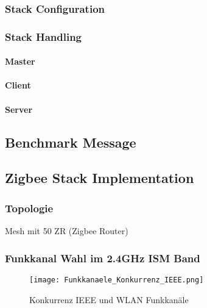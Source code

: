 \subsubsection{Stack Configuration}\label{subsubsec:ZigbeeStackConfiguration}


\subsubsection{Stack Handling}\label{subsubsec:ZigbeeStackHandling}


\paragraph{Master}\label{par:ZigbeeMaster}

\paragraph{Client}\label{par:ZigbeeClient}

\paragraph{Server}\label{par:ZigbeeServer}


\subsection{Benchmark Message}\label{subsec:BenchmarkMessage}

\subsection{Zigbee Stack Implementation}\label{subsec:ZigbeeStackImplementation}

\subsubsection{Topologie}\label{subsubsec:ZigbeeTopologie}

Mesh mit 50 ZR (Zigbee Router)


\subsubsection{Funkkanal Wahl im 2.4GHz ISM Band}\label{subsubsec:FunkkanalWahlim2.4GHzISMBand}

\begin{figure}[h]
	\centering
	\texttt{[image: Funkkanaele\_Konkurrenz\_IEEE.png]}
	\caption{Konkurrenz IEEE und WLAN Funkkanäle \cite{markus_krause_rainer_konrad_drahtlose_2014}}
	\label{fig:KonkurrenzIEEEundWLANFunkkanäle}
\end{figure}

